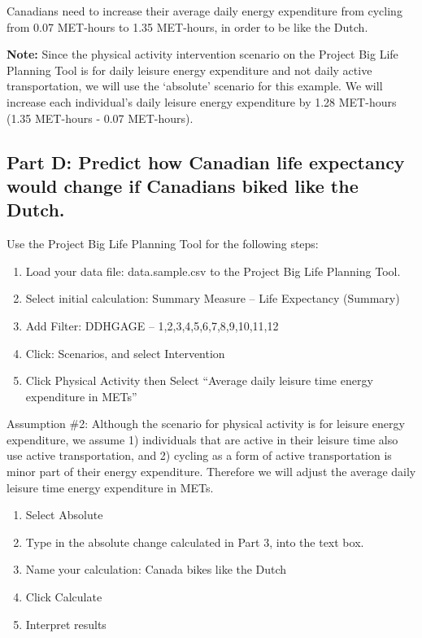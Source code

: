 \documentclass[]{book}
\begin{document}
Canadians need to increase their average daily energy expenditure from
cycling from 0.07 MET-hours to 1.35 MET-hours, in order to be like the
Dutch.

\textbf{Note:} Since the physical activity intervention scenario on the
Project Big Life Planning Tool is for daily leisure energy expenditure
and not daily active transportation, we will use the `absolute' scenario
for this example. We will increase each individual's daily leisure
energy expenditure by 1.28 MET-hours (1.35 MET-hours - 0.07 MET-hours).

\subsection{Part D: Predict how Canadian life expectancy would change if
Canadians biked like the
Dutch.}\label{part-d-predict-how-canadian-life-expectancy-would-change-if-canadians-biked-like-the-dutch.}

Use the Project Big Life Planning Tool for the following steps:

\begin{enumerate}
\def\labelenumi{\arabic{enumi}.}
\item
  Load your data file: data.sample.csv to the Project Big Life Planning
  Tool.
\item
  Select initial calculation: Summary Measure -- Life Expectancy
  (Summary)
\item
  Add Filter: DDHGAGE -- 1,2,3,4,5,6,7,8,9,10,11,12
\item
  Click: Scenarios, and select Intervention
\item
  Click Physical Activity then Select ``Average daily leisure time
  energy expenditure in METs''
\end{enumerate}

Assumption \#2: Although the scenario for physical activity is for
leisure energy expenditure, we assume 1) individuals that are active in
their leisure time also use active transportation, and 2) cycling as a
form of active transportation is minor part of their energy expenditure.
Therefore we will adjust the average daily leisure time energy
expenditure in METs.

\begin{enumerate}
\def\labelenumi{\arabic{enumi}.}
\setcounter{enumi}{5}
\item
  Select Absolute
\item
  Type in the absolute change calculated in Part 3, into the text box.
\item
  Name your calculation: Canada bikes like the Dutch
\item
  Click Calculate
\item
  Interpret results
\end{enumerate}
\end{document}
